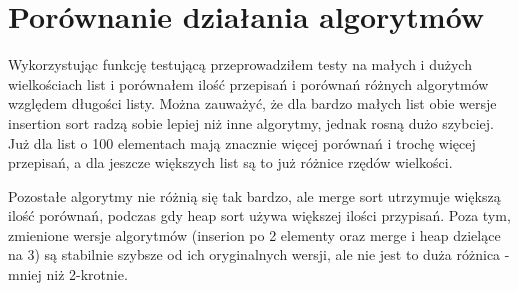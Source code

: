 \documentclass{article}
\begin{document}
\section{Porównanie działania algorytmów}

Wykorzystując funkcję testującą przeprowadziłem testy na małych i dużych wielkościach list i porównałem ilość przepisań i porównań różnych algorytmów względem długości listy. Można zauważyć, że dla bardzo małych list obie wersje insertion sort radzą sobie lepiej niż inne algorytmy, jednak rosną dużo szybciej. Już dla list o 100 elementach mają znacznie więcej porównań i trochę więcej przepisań, a dla jeszcze większych list są to już różnice rzędów wielkości.

Pozostałe algorytmy nie różnią się tak bardzo, ale merge sort utrzymuje większą ilość porównań, podczas gdy heap sort używa większej ilości przypisań. Poza tym, zmienione wersje algorytmów (inserion po 2 elementy oraz merge i heap dzielące na 3) są stabilnie szybsze od ich oryginalnych wersji, ale nie jest to duża różnica - mniej niż 2-krotnie. 
\end{document}
